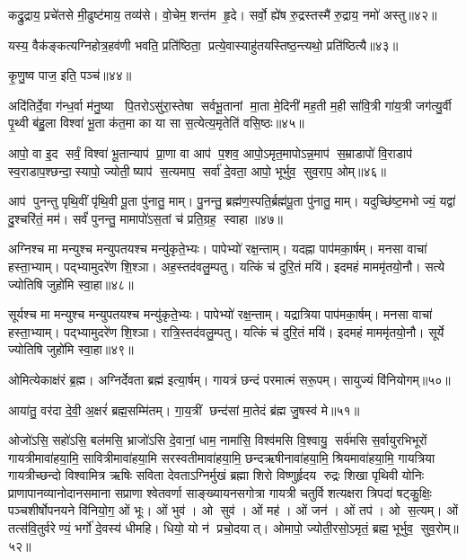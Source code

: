 कद्रु॒द्राय॒ प्रचे॑तसे मी॒ढुष्ट॑माय॒ तव्य॑से। वो॒चेम॒ शन्त॑म हृ॒दे। सर्वो॒ ह्ये॑ष रु॒द्रस्तस्मै॑ रु॒द्राय॒ नमो॑ अस्तु॥४२॥
\anuvakamend

यस्य॒ वैक॑ङ्कत्यग्निहोत्र॒हव॑णी भवति॒ प्रति॑ष्ठिता॒ प्रत्ये॒वास्याहु॑तय\-स्तिष्ठ॒न्त्यथो॒ प्रति॑ष्ठित्यै॥४३॥
\anuvakamend


कृ॒णु॒ष्व पाज॒ इति॒ पञ्च॑॥४४॥
\anuvakamend

अदि॑तिर्दे॒वा ग॑न्ध॒र्वा म॑नु॒ष्या पि॒तरोऽसु॑रा॒स्तेषा सर्वभू॒तानां मा॒ता मे॒दिनी॑ मह॒ती म॒ही सा॑वि॒त्री गा॑य॒त्री जग॑त्यु॒र्वी पृ॒थ्वी ब॑हु॒ला विश्वा॑ भू॒ता क॑त॒मा का या सा स॒त्येत्य॒मृतेति॑ वसि॒ष्ठः॥४५॥
\anuvakamend

आपो॒ वा इ॒द सर्वं॒ विश्वा॑ भू॒तान्याप॑ प्रा॒णा वा आप॑ प॒शव॒ आपो॒ऽमृत॒मापोऽन्न॒माप॑ स॒म्राडापो॑ वि॒राडाप॑ स्व॒राडाप॒श्छन्दा॒स्यापो॒ ज्योती॒ष्याप॑ स॒त्यमाप॒ सर्वा॑ दे॒वता॒ आपो॒ भूर्भुव॒ सुव॒राप॒ ओम्॥४६॥
\anuvakamend

आप॑ पुनन्तु पृथि॒वीं पृ॑थि॒वी पू॒ता पु॑नातु॒ माम्। पु॒नन्तु॒ ब्रह्म॑ण॒स्पति॒र्ब्रह्म॑पू॒ता पु॑नातु॒ माम्। यदुच्छि॑ष्ट॒मभोज्यं॒ यद्वा॑ दु॒श्चरि॑तं॒ मम॑। सर्वं॑ पुनन्तु॒ मामापो॑ऽस॒तां च॑ प्रति॒ग्रह॒ स्वाहा॥४७॥
\anuvakamend


अग्निश्च मा मन्युश्च मन्युपतयश्च मन्यु॑कृते॒भ्यः। पापेभ्यो॑ रक्ष॒न्ताम्। यदह्ना पाप॑मका॒र्\mbox{}षम्। मनसा वाचा॑ हस्ता॒भ्याम्। पद्भ्यामुदरे॑ण शि॒श्ञा। अह॒स्तद॑वलु॒म्पतु। यत्किं च॑ दुरि॒तं मयि॑। इदमहं माममृ॑तयो॒नौ। सत्ये ज्योतिषि जुहो॑मि स्वा॒हा॥४८॥
\anuvakamend


सूर्यश्च मा मन्युश्च मन्युपतयश्च मन्यु॑कृते॒भ्यः। पापेभ्यो॑ रक्ष॒न्ताम्। यद्रात्रिया पाप॑मका॒र्\mbox{}षम्। मनसा वाचा॑ हस्ता॒भ्याम्। पद्भ्यामुदरे॑ण शि॒श्ञा। रात्रि॒स्तद॑वलु॒म्पतु। यत्किं च॑ दुरि॒तं मयि॑। इदमहं माममृ॑तयो॒नौ। सूर्ये ज्योतिषि जुहो॑मि स्वा॒हा॥४९॥
\anuvakamend

ओमित्येकाक्ष॑रं ब्र॒ह्म। अग्निर्देवता ब्रह्म॑ इत्या॒र्\mbox{}षम्। गायत्रं छन्दं परमात्मं सरू॒पम्। सायुज्यं वि॑नियोगम्॥५०॥
\anuvakamend

आया॑तु॒ वर॑दा दे॒वी॒ अ॒क्षरं॑ ब्रह्म॒सम्मि॑तम्। गा॒य॒त्रीं छन्द॑सां मा॒तेदं ब्र॑ह्म जु॒षस्व॑ मे॥५१॥ 
\anuvakamend

ओजो॑ऽसि॒ सहो॑ऽसि॒ बल॑मसि॒ भ्राजो॑ऽसि दे॒वानां॒ धाम॒ नामा॑सि॒ विश्व॑मसि वि॒श्वायु॒ सर्व॑मसि स॒र्वायुरभिभूरों गायत्रीमावा॑हया॒मि॒ सावित्रीमावा॑हया॒मि सरस्वतीमावा॑ह\-या॒मि॒ छन्दऋषीनावा॑हया॒मि॒ श्रियमावा॑हया॒मि॒ गायत्रिया गायत्रीच्छन्दो विश्वामित्र ऋषिः सविता देवताऽग्निर्मुखं ब्रह्मा शिरो विष्णुर्\mbox{}हृदय रुद्रः शिखा पृथिवी योनिः प्राणापानव्यानोदानसमाना सप्राणा श्वेतवर्णा साङ्ख्यायनसगोत्रा गायत्री चतुर्विशत्यक्षरा त्रिपदा॑ षट्कु॒क्षिः॒ पञ्चशीर्\mbox{}षोपनयने वि॑नियो॒ग॒ ओं भूः। ओं भुव॑। ओ सुव॑। ओं मह॑। ओं जन॑। ओं तप॑। ओ स॒त्यम्। ओं तत्स॑वि॒तुर्वरेण्यं॒ भर्गो॑ दे॒वस्य॑ धीमहि। धियो॒ यो न॑ प्रचो॒दयात्। ओमापो॒ ज्योती॒रसो॒ऽमृतं॒ ब्रह्म॒ भूर्भुव॒ सुव॒रोम्॥५२॥
\anuvakamend

